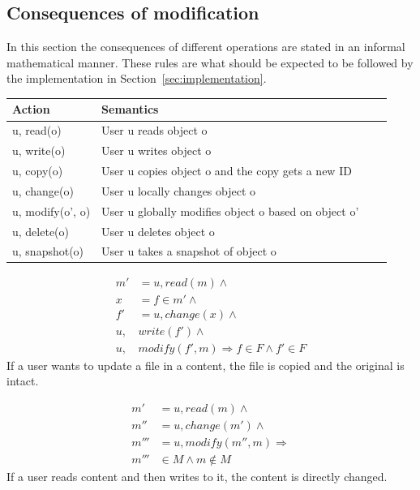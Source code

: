 \documentclass[a4paper,12pt]{article}
\newcommand{\Implies}{\Rightarrow}
\begin{document}
\subsection{Consequences of modification} \label{sec:conseq}

In this section the consequences of different operations are stated in an informal mathematical
manner. These rules are what should be expected to be followed by the implementation in
Section~\ref{sec:implementation}. 

\begin{center}
    \begin{tabular}{ | l | l | l | p{5cm} |}
        \hline
        \textbf{Action} & \textbf{Semantics} \\ \hline
        u, read(o)            & User u reads object o\\ \hline
        u, write(o)           & User u writes object o\\ \hline
        u, copy(o)            & User u copies object o and the copy gets a new ID\\ \hline
        u, change(o)          & User u locally changes object o \\ \hline
        u, modify(o', o)      & User u globally modifies object o based on object o'\\ \hline
        u, delete(o)          & User u deletes object o\\ \hline
        u, snapshot(o)        & User u takes a snapshot of object o \\ \hline
    \end{tabular}
\end{center}

\begin{equation} \label{eq:fileupdate}
    \begin{split}
        m' & = u, read(m) \land \\
        x  & = f \in m' \land \\
        f' & = u, change(x) \land \\
        u, & write(f') \land \\
        u, & modify(f', m) \Implies f \in F \land f' \in F
    \end{split}
\end{equation}
If a user wants to update a file in a content, the file is copied and the original is intact.

\begin{equation} \label{eq:contentupdate}
    \begin{split}
        m' & = u, read(m) \land \\
        m'' & = u, change(m') \land \\
        m''' & = u, modify(m'', m) \Implies \\
        m''' & \in M \land m \not \in M
    \end{split}
\end{equation}
If a user reads content and then writes to it, the content is directly changed.
\end{document}

